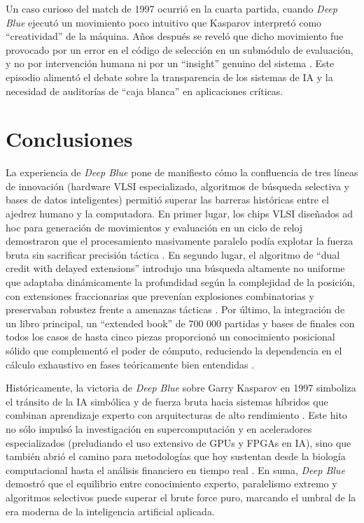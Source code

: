 \documentclass[a4paper, 12pt]{article}
\begin{document}
Un caso curioso del match de 1997 ocurrió en la cuarta partida, 
cuando \textit{Deep Blue} ejecutó un movimiento poco intuitivo 
que Kasparov interpretó como “creatividad” de la máquina. Años 
después se reveló que dicho movimiento fue provocado por un 
error en el código de selección en un submódulo de evaluación, y 
no por intervención humana ni por un “insight” genuino del 
sistema \cite{wikideepblue}\cite{time2013}. Este episodio 
alimentó el debate sobre la transparencia de los sistemas de 
IA y la necesidad de auditorías de “caja blanca” en aplicaciones 
críticas.  




\newpage
\section{Conclusiones}


La experiencia de \textit{Deep Blue} pone de manifiesto cómo la 
confluencia de tres líneas de innovación (hardware VLSI 
especializado, algoritmos de búsqueda selectiva y bases de datos 
inteligentes) permitió superar las barreras históricas entre el 
ajedrez humano y la computadora. En primer lugar, los chips 
VLSI diseñados ad hoc para generación de movimientos y 
evaluación en un ciclo de reloj demostraron que el procesamiento 
masivamente paralelo podía explotar la fuerza bruta sin 
sacrificar precisión táctica \cite{Campbell2002}\cite{turn0search10}. 
En segundo lugar, el algoritmo de “dual credit with delayed 
extensions” introdujo una búsqueda altamente no uniforme que 
adaptaba dinámicamente la profundidad según la complejidad de 
la posición, con extensiones fraccionarias que prevenían 
explosiones combinatorias y preservaban robustez frente a 
amenazas tácticas \cite{turn0search3}. Por último, la 
integración de un libro principal, un “extended book” de 700 000 
partidas y bases de finales con todos los casos de hasta cinco 
piezas proporcionó un conocimiento posicional sólido que 
complementó el poder de cómputo, reduciendo la dependencia en 
el cálculo exhaustivo en fases teóricamente bien entendidas 
\cite{turn0search2}\cite{turn0search4}.

Históricamente, la victoria de \textit{Deep Blue} sobre Garry 
Kasparov en 1997 simboliza el tránsito de la IA simbólica y de 
fuerza bruta hacia sistemas híbridos que combinan aprendizaje 
experto con arquitecturas de alto rendimiento \cite{turn0search9}. 
Este hito no sólo impulsó la investigación en supercomputación y 
en aceleradores especializados (preludiando el uso extensivo de 
GPUs y FPGAs en IA), sino que también abrió el camino para metodologías 
que hoy sustentan desde la biología computacional hasta el 
análisis financiero en tiempo real \cite{turn0news55}\cite{turn0search8}. 
En suma, \textit{Deep Blue} demostró que el equilibrio entre 
conocimiento experto, paralelismo extremo y algoritmos 
selectivos puede superar el brute force puro, marcando el 
umbral de la era moderna de la inteligencia artificial aplicada.



\newpage

\end{document}
